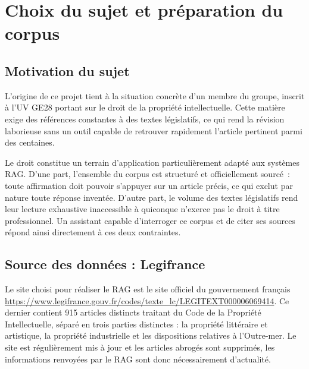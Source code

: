 \chapter{Choix du sujet et préparation du corpus}


\section{Motivation du sujet}
L'origine de ce projet tient à la situation concrète d'un membre du groupe, inscrit à l'UV GE28 portant sur le droit de la propriété intellectuelle. Cette matière exige des références constantes à des textes législatifs, ce qui rend la révision laborieuse sans un outil capable de retrouver rapidement l'article pertinent parmi des centaines.

Le droit constitue un terrain d'application particulièrement adapté aux systèmes RAG. D'une part, l'ensemble du corpus est structuré et officiellement sourcé~: toute affirmation doit pouvoir s'appuyer sur un article précis, ce qui exclut par nature toute réponse inventée. D'autre part, le volume des textes législatifs rend leur lecture exhaustive inaccessible à quiconque n'exerce pas le droit à titre professionnel. Un assistant capable d'interroger ce corpus et de citer ses sources répond ainsi directement à ces deux contraintes.

\section{Source des données : Legifrance}
Le site choisi pour réaliser le RAG est le site officiel du gouvernement français \url{https://www.legifrance.gouv.fr/codes/texte_lc/LEGITEXT000006069414}.
Ce dernier contient 915 articles distincts traitant du Code de la Propriété Intellectuelle, séparé en trois parties distinctes : la propriété littéraire et artistique, la propriété industrielle et les dispositions relatives à l'Outre-mer. Le site est régulièrement mis à jour et les articles abrogés sont supprimés, les informations renvoyées par le RAG sont donc nécessairement d'actualité.

